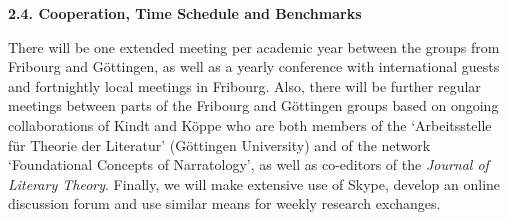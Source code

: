 
\vspace{.4cm}
\noindent\textbf{2.4. Cooperation, Time Schedule and Benchmarks}
\vspace{.2cm}

\noindent There will be one extended meeting per academic year between the groups from Fribourg and G\"ottingen, as well as a yearly conference with international guests and fortnightly local meetings in Fribourg. Also, there will be further regular meetings between parts of the Fribourg and G\"ottingen groups based on ongoing collaborations of Kindt and K\"oppe who are both members of the `Arbeitsstelle f\"ur Theorie der Literatur' (G\"ottingen University) and of the network `Foundational Concepts of Narratology', as well as co-editors of the \emph{Journal of Literary Theory}. Finally, we will make extensive use of Skype, develop an online discussion forum and use similar means for weekly research exchanges.

